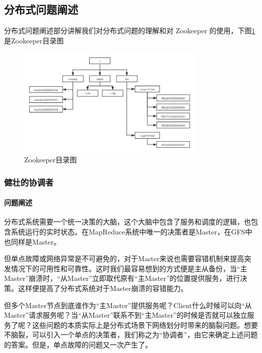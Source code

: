 \documentclass[UTF8]{ctexart}
\begin{document}
\subsection{分布式问题阐述}
分布式问题阐述部分讲解我们对分布式问题的理解和对 Zookeeper 的使用，下图\ref{fig:Zookeeper目录图}是Zookeeper目录图
\begin{figure}[h]
    \centering
    \includegraphics[width=0.8\textwidth, height=0.6\textwidth]{zookeeper.png}
	\caption{Zookeeper目录图}
	\label{fig:Zookeeper目录图}
\end{figure}
\subsubsection{健壮的协调者}

\paragraph{问题阐述}
分布式系统需要一个统一决策的大脑，这个大脑中包含了服务和调度的逻辑，也包含系统运行的实时状态。在MapReduce系统中唯一的决策者是Master，在GFS中也同样是Master。

但单点故障或网络异常是不可避免的，对于Master来说也需要容错机制来提高突发情况下的可用性和可靠性。这时我们最容易想到的方式便是主从备份，当“主Master”崩溃时，“从Master”立即取代原有“主Master”的位置提供服务，进行决策。这样便提高了分布式系统对于Master崩溃的容错能力。

但多个Master节点到底谁作为“主Master”提供服务呢？Client什么时候可以向“从Master”请求服务呢？当“从Master”联系不到“主Master”的时候是否就可以独立服务了呢？这些问题的本质实际上是分布式场景下网络划分时带来的脑裂问题。想要不脑裂，可以引入一个单点的决策者，我们称之为“协调者”，由它来确定上述问题的答案。但是，单点故障的问题又一次产生了。
\end{document}
